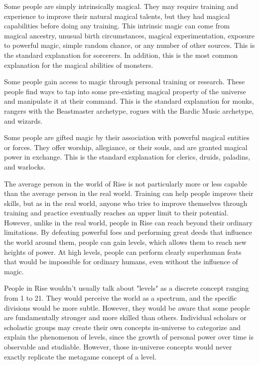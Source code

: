   Some people are simply intrinsically magical.
  They may require training and experience to improve their natural magical talents, but they had magical capabilities before doing any training.
  This intrinsic magic can come from magical ancestry, unusual birth circumstances, magical experimentation, exposure to powerful magic, simple random chance, or any number of other sources.
  This is the standard explanation for sorcerers.
  In addition, this is the most common explanation for the magical abilities of monsters.

  Some people gain access to magic through personal training or research.
  These people find ways to tap into some pre-existing magical property of the universe and manipulate it at their command.
  This is the standard explanation for monks, rangers with the Beastmaster archetype, rogues with the Bardic Music archetype, and wizards.

  Some people are gifted magic by their association with powerful magical entities or forces.
  They offer worship, allegiance, or their souls, and are granted magical power in exchange.
  This is the standard explanation for clerics, druids, paladins, and warlocks.

  The average person in the world of Rise is not particularly more or less capable than the average person in the real world.
  Training can help people improve their skills, but as in the real world, anyone who tries to improve themselves through training and practice eventually reaches an upper limit to their potential.
  However, unlike in the real world, people in Rise can reach beyond their ordinary limitations.
  By defeating powerful foes and performing great deeds that influence the world around them, people can gain levels, which allows them to reach new heights of power.
  At high levels, people can perform clearly superhuman feats that would be impossible for ordinary humans, even without the influence of magic.

  People in Rise wouldn't usually talk about "levels" as a discrete concept ranging from 1 to 21.
  They would perceive the world as a spectrum, and the specific divisions would be more subtle.
  However, they would be aware that some people are fundamentally stronger and more skilled than others.
  Individual scholars or scholastic groups may create their own concepts in-universe to categorize and explain the phenomenon of levels, since the growth of personal power over time is observable and studiable.
  However, those in-universe concepts would never exactly replicate the metagame concept of a level.

